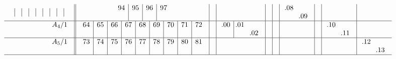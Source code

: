 \documentclass[12pt,a4paper]{amsart}
\begin{document}
\begin{align*}
\begin{array}{r||c|c|c|c|c|c|c|c|c}
\begin{array}{c|c|c|c|c|c|c|c|c}
&&&&&&&&\\
  \end{array}
&
   \begin{array}{c|c|c|c}
94&95&96&97\\
&&&\\
   \end{array}
&&&&&
    \begin{array}{cc}
\llap.08&\\
&\llap.09\\
    \end{array}
&& \\\hline
    \begin{array}{r}
      A_4/1 \\ \\
    \end{array}
&
  \begin{array}{c|c|c|c|c|c|c|c|c}
64&65&66&67&68&69&70&71&72\\
&&&&&&&&\\
  \end{array}
&&
    \begin{array}{c|cc}
\llap.00&\llap.01&\\
&&\llap.02\\
    \end{array}
&&&&&
    \begin{array}{cc}
\llap.10&\\
&\llap.11\\
    \end{array}
& \\\hline
    \begin{array}{r}
      A_5/1 \\ \\
    \end{array}
&
  \begin{array}{c|c|c|c|c|c|c|c|c}
73&74&75&76&77&78&79&80&81\\
&&&&&&&&\\
  \end{array}
&&&&&&&&
    \begin{array}{cc}
\llap.12&\\
&\llap.13\\
    \end{array}
 \\\hline
  \end{array}
\end{align*}
\end{document}
